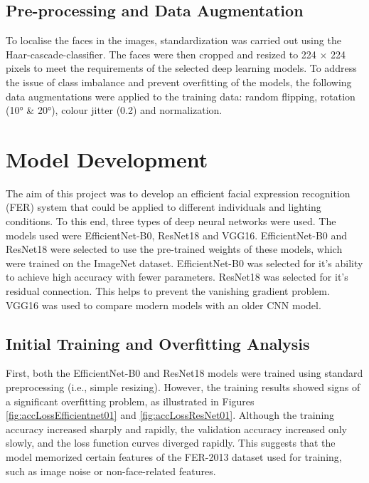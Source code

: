\section{Pre-processing and Data Augmentation}

To localise the faces in the images, standardization was carried out using the Haar-cascade-classifier. The faces were then cropped and resized to 224 × 224 pixels to meet the requirements of the selected deep learning models. To address the issue of class imbalance and prevent overfitting of the models, the following data augmentations were applied to the training data: random flipping, rotation (10° \& 20°), colour jitter (0.2) and normalization.
\newline

\chapter{Model Development}

The aim of this project was to develop an efficient facial expression recognition (FER) system that could be applied to different individuals and lighting conditions. To this end, three types of deep neural networks were used. The models used were EfficientNet-B0, ResNet18 and VGG16.
EfficientNet-B0 and ResNet18 were selected to use the pre-trained weights of these models, which were trained on the ImageNet dataset. EfficientNet-B0 was selected for it's ability to achieve high accuracy with fewer parameters. ResNet18 was selected for it's residual connection. This helps to prevent the vanishing gradient problem. VGG16 was used to compare modern models with an older CNN model.
\newline

\section{Initial Training and Overfitting Analysis}

First, both the EfficientNet-B0 and ResNet18 models were trained using standard preprocessing (i.e., simple resizing). However, the training results showed signs of a significant overfitting problem, as illustrated in Figures \ref{fig:accLossEfficientnet01} and \ref{fig:accLossResNet01}. Although the training accuracy increased sharply and rapidly, the validation accuracy increased only slowly, and the loss function curves diverged rapidly. This suggests that the model memorized certain features of the FER-2013 dataset used for training, such as image noise or non-face-related features.
\newline

